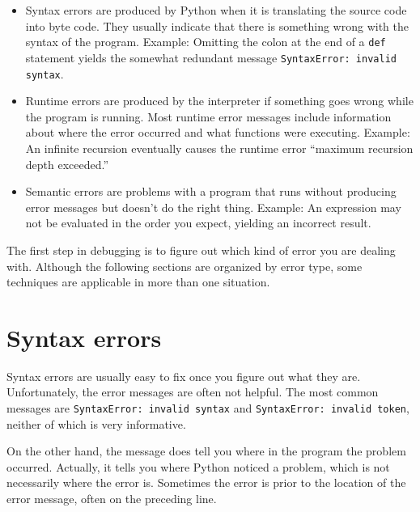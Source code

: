 \documentclass[10pt]{book}
\begin{document}
\begin{CJK}{UTF8}{gbsn}
\begin{itemize}

\item Syntax errors are produced by Python when it is translating the
  source code into byte code.  They usually indicate that there is
  something wrong with the syntax of the program.  Example: Omitting
  the colon at the end of a {\tt def} statement yields the somewhat
  redundant message {\tt SyntaxError: invalid syntax}.

\item Runtime errors are produced by the interpreter if something goes
  wrong while the program is running.  Most runtime error messages
  include information about where the error occurred and what
  functions were executing.  Example: An infinite recursion eventually
  causes the runtime error ``maximum recursion depth exceeded.''

\item Semantic errors are problems with a program that runs without
  producing error messages but doesn't do the right thing.  Example:
  An expression may not be evaluated in the order you expect, yielding
  an incorrect result.

\end{itemize}

The first step in debugging is to figure out which kind of
error you are dealing with.  Although the following sections are
organized by error type, some techniques are
applicable in more than one situation.


\section{Syntax errors}

Syntax errors are usually easy to fix once you figure out what they
are.  Unfortunately, the error messages are often not helpful.
The most common messages are {\tt SyntaxError: invalid syntax} and
{\tt SyntaxError: invalid token}, neither of which is very informative.

On the other hand, the message does tell you where in the program the
problem occurred.  Actually, it tells you where Python
noticed a problem, which is not necessarily where the error
is.  Sometimes the error is prior to the location of the error
message, often on the preceding line.


\end{CJK}
\end{document}
